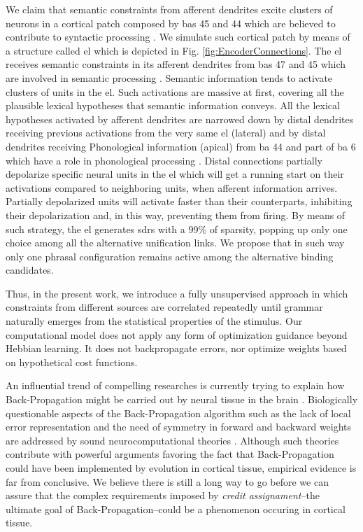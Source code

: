 {We claim that semantic constraints from afferent dendrites excite clusters of neurons in a cortical patch composed by \glspl{ba} 45 and 44 which are believed to contribute to syntactic processing \cite{Pallier2522, doi:10.1152/physrev.00006.2011, doi:10.1146/annurev-neuro-071013-013847}. We simulate such cortical patch by means of a structure called \gls{el} which is depicted in Fig. \ref{fig:EncoderConnections}. The \gls{el} receives semantic constraints in its afferent dendrites from \glspl{ba} 47 and 45 which are involved in semantic processing \cite{GOUCHA2015294, DECARLI2007933, PMID:15528098, NEWMAN201051}. Semantic information tends to activate clusters of units in the \gls{el}. Such activations are massive at first, covering all the plausible lexical hypotheses that semantic information conveys. All the lexical hypotheses activated by afferent dendrites are narrowed down by distal dendrites receiving previous activations from the very same \gls{el} (lateral) and by distal dendrites receiving Phonological information (apical) from \gls{ba} 44 and part of \gls{ba} 6 which have a role in phonological processing \cite{Lee3942, PMID:27381836, HEIM2003285,
PMID:18296070, AMUNTS200442}. Distal connections partially depolarize specific neural units in the \gls{el} which will get a running start on their activations compared to neighboring units, when afferent information arrives. Partially depolarized units will activate faster than their counterparts, inhibiting their depolarization and, in this way, preventing them from firing. By means of such strategy, the \gls{el} generates \glspl{sdr} with a 99\% of sparsity, popping up only one choice among all the alternative unification links. We propose that in such way only one phrasal configuration remains active among the alternative binding candidates.

Thus, in the present work, we introduce a fully unsupervised approach in which constraints from different sources are correlated repeatedly until grammar naturally emerges from the statistical properties of the stimulus. Our computational model does not apply any form of optimization guidance beyond Hebbian learning. It does not backpropagate errors, nor optimize weights based on hypothetical cost functions. 

An influential trend of compelling researches is currently trying to explain how Back-Propagation might be carried out by neural tissue in the brain \cite{WHITTINGTON2019235}. Biologically questionable aspects of the Back-Propagation algorithm such as the lack of local error representation and the need of symmetry in forward and backward weights are addressed by sound neurocomputational theories \cite{10.7554/eLife.22901, Lillicrap_2016}. Although such theories contribute with powerful arguments favoring the fact that Back-Propagation could have been implemented by evolution in cortical tissue, empirical evidence is far from conclusive. We believe there is still a long way to go before we can assure that the complex requirements imposed by \emph{credit assignament}--the ultimate goal of Back-Propagation--could be a phenomenon occuring in cortical tissue.

}
